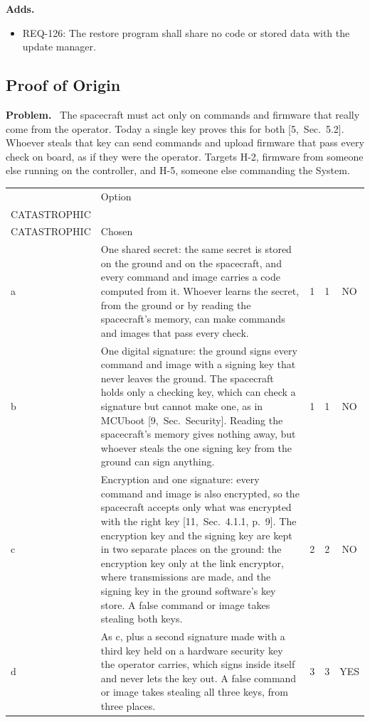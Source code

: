 \documentclass[11pt,a4paper]{article}
\makeatletter
\newcommand{\sev}[2]{\begin{tabular}[b]{@{}c@{}}#1\\{\scriptsize #2}\end{tabular}}
\newcommand{\field}[1]{\par\needspace{4\baselineskip}\smallskip\noindent\textbf{#1.}~}
\makeatother
\begin{document}
\field{Adds}
\begin{itemize}
\item REQ-126: The restore program shall share no code or stored data with the update manager.
\end{itemize}

\subsection{Proof of Origin}
\label{sec:origin}
\field{Problem} The spacecraft must act only on commands and firmware that
really come from the operator. Today a single key proves this for both
[5,~Sec.~5.2]. Whoever steals that key can send commands and upload firmware
that pass every check on board, as if they were the operator. Targets H-2,
firmware from someone else running on the controller, and H-5, someone else
commanding the System.

\smallskip
{\small\noindent\begin{tabularx}{\textwidth}{@{}l>{\raggedright\arraybackslash}Xccc@{}}
\toprule
 & Option & \sev{H-2}{CATASTROPHIC} & \sev{H-5}{CATASTROPHIC} & Chosen \\
\midrule
a & One shared secret: the same secret is stored on the ground and on the spacecraft, and every command and image carries a code computed from it. Whoever learns the secret, from the ground or by reading the spacecraft's memory, can make commands and images that pass every check. & 1 & 1 & NO \\
b & One digital signature: the ground signs every command and image with a signing key that never leaves the ground. The spacecraft holds only a checking key, which can check a signature but cannot make one, as in MCUboot [9,~Sec.~Security]. Reading the spacecraft's memory gives nothing away, but whoever steals the one signing key from the ground can sign anything. & 1 & 1 & NO \\
c & Encryption and one signature: every command and image is also encrypted, so the spacecraft accepts only what was encrypted with the right key [11,~Sec.~4.1.1, p.~9]. The encryption key and the signing key are kept in two separate places on the ground: the encryption key only at the link encryptor, where transmissions are made, and the signing key in the ground software's key store. A false command or image takes stealing both keys. & 2 & 2 & NO \\
d & As c, plus a second signature made with a third key held on a hardware security key the operator carries, which signs inside itself and never lets the key out. A false command or image takes stealing all three keys, from three places. & 3 & 3 & YES \\
\bottomrule
\end{tabularx}}
\end{document}
